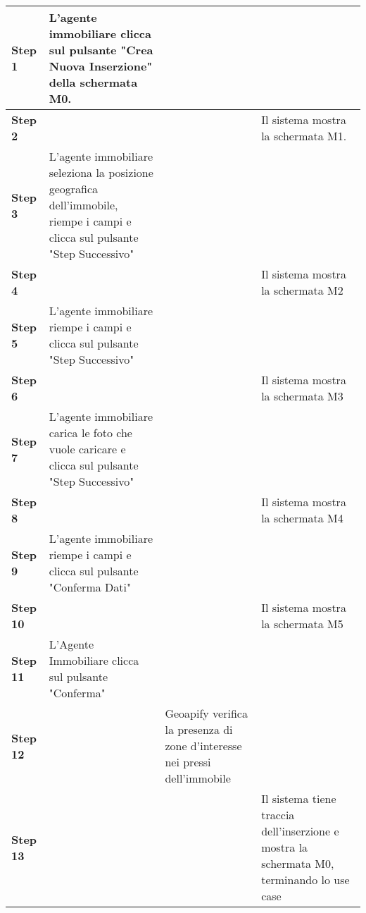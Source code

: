 \begin{longtable}{|m{4cm}|m{4cm}|m{3cm}|m{4cm}|}
        \hline
        \textbf{Step 1 }& L'agente immobiliare clicca sul pulsante "Crea Nuova Inserzione" della schermata M0. & & \\
        \hline
        \textbf{Step 2 }& & & Il sistema mostra la schermata M1. \\
        \hline
        \textbf{Step 3 }& L'agente immobiliare seleziona la posizione geografica dell'immobile, riempe i campi e clicca sul pulsante "Step Successivo"  & & \\
        \hline
        \textbf{Step 4} & & & Il sistema mostra la schermata M2 \\
        \hline 
        \textbf{Step 5 }& L'agente immobiliare riempe i campi e clicca sul pulsante "Step Successivo" & & \\
        \hline
        \textbf{Step 6 }& & & Il sistema mostra la schermata M3 \\
        \hline 
        \textbf{Step 7} & L'agente immobiliare carica le foto che vuole caricare e clicca sul pulsante "Step Successivo" & & \\
        \hline
        \textbf{ Step 8} & & & Il sistema mostra la schermata M4 \\
        \hline
        \textbf{Step 9 }& L'agente immobiliare riempe i campi e clicca sul pulsante "Conferma Dati" & & \\
        \hline
        \textbf{Step 10} & & & Il sistema mostra la schermata M5 \\
        \hline
        \textbf{Step 11} & L'Agente Immobiliare clicca sul pulsante "Conferma" & & \\
        \hline
        \textbf{Step 12} & & Geoapify verifica la presenza di zone d'interesse nei pressi dell'immobile & \\
        \hline
        \textbf{Step 13} & & & Il sistema tiene traccia dell'inserzione e mostra la schermata M0, terminando lo use case \\
        \hline
    \end{longtable}



